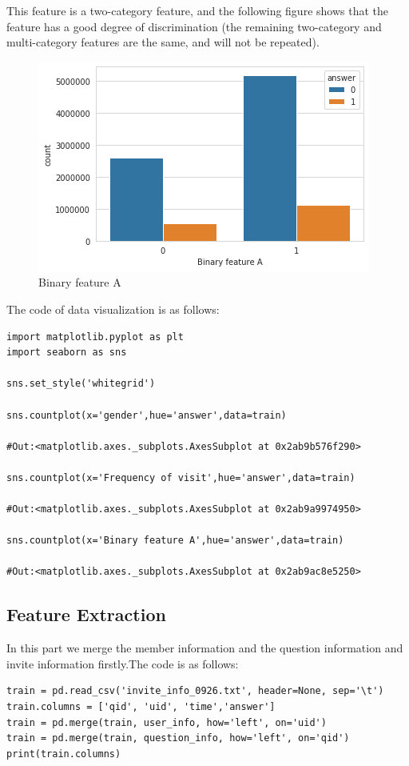 \documentclass[sigconf]{acmart}
\begin{document}
This feature is a two-category feature, and the following figure shows that the feature has a good degree of discrimination (the remaining two-category and multi-category features are the same, and will not be repeated).

\begin{figure}[H]
  \centering
  \includegraphics[width=\linewidth]{3.png}
  \caption{Binary feature A}
\end{figure}


The code of data visualization is as follows:
\begin{lstlisting}
import matplotlib.pyplot as plt
import seaborn as sns

sns.set_style('whitegrid')

sns.countplot(x='gender',hue='answer',data=train)

#Out:<matplotlib.axes._subplots.AxesSubplot at 0x2ab9b576f290>

sns.countplot(x='Frequency of visit',hue='answer',data=train)

#Out:<matplotlib.axes._subplots.AxesSubplot at 0x2ab9a9974950>

sns.countplot(x='Binary feature A',hue='answer',data=train)

#Out:<matplotlib.axes._subplots.AxesSubplot at 0x2ab9ac8e5250>
\end{lstlisting}



\subsection{Feature Extraction}

In this part we merge the member information and the question information and invite information firstly.The code is as follows:
\begin{lstlisting}
train = pd.read_csv('invite_info_0926.txt', header=None, sep='\t')
train.columns = ['qid', 'uid', 'time','answer']
train = pd.merge(train, user_info, how='left', on='uid')
train = pd.merge(train, question_info, how='left', on='qid')
print(train.columns)

\end{lstlisting}
\end{document}

